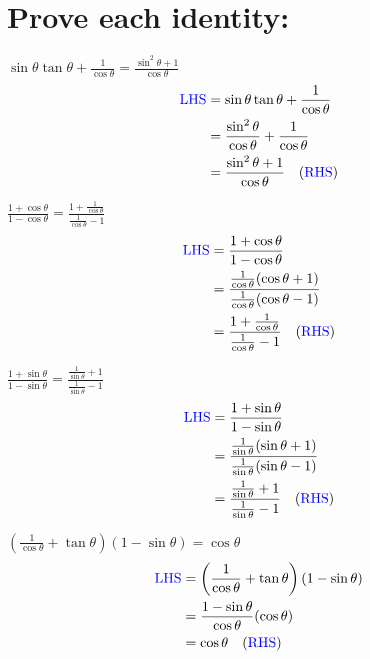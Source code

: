 \documentclass{article}
\begin{document}
\section{Prove each identity:}
\begin{multienum}
    \item $\sin \theta \tan \theta+\frac{1}{\cos \theta}=\frac{\sin ^2 \theta+1}{\cos \theta}$
    \begin{align*}
        \text{\textcolor{blue}{LHS}} &= \sin \theta \tan \theta+\frac{1}{\cos \theta} \\
        &= \frac{\sin^2 \theta}{\cos \theta}+\frac{1}{\cos \theta} \\
        &= \frac{\sin ^2 \theta+1}{\cos \theta} \quad (\text{\textcolor{blue}{RHS}})
    \end{align*}

    \item $\frac{1+\cos \theta}{1-\cos \theta}=\frac{1+\frac{1}{\cos \theta}}{\frac{1}{\cos \theta}-1}$
    \begin{align*}
        \text{\textcolor{blue}{LHS}} &= \frac{1+\cos \theta}{1-\cos \theta} \\
        &= \frac{\frac{1}{\cos \theta}(\cos \theta+1)}{\frac{1}{\cos \theta}(\cos \theta-1)} \\
        &= \frac{1+\frac{1}{\cos \theta}}{\frac{1}{\cos \theta}-1} \quad (\text{\textcolor{blue}{RHS}})
    \end{align*}

    \item $\frac{1+\sin \theta}{1-\sin \theta}=\frac{\frac{1}{\sin \theta}+1}{\frac{1}{\sin \theta}-1}$
    \begin{align*}
        \text{\textcolor{blue}{LHS}} &= \frac{1+\sin \theta}{1-\sin \theta} \\
        &= \frac{\frac{1}{\sin \theta}(\sin \theta+1)}{\frac{1}{\sin \theta}(\sin \theta-1)} \\
        &= \frac{\frac{1}{\sin \theta}+1}{\frac{1}{\sin \theta}-1} \quad (\text{\textcolor{blue}{RHS}})
    \end{align*}

    \item $\left(\frac{1}{\cos \theta}+\tan \theta\right)(1-\sin \theta)=\cos \theta$
    \begin{align*}
        \text{\textcolor{blue}{LHS}} &= \left(\frac{1}{\cos \theta}+\tan \theta\right)(1-\sin \theta) \\
        &= \frac{1-\sin \theta}{\cos \theta}(\cos \theta) \\
        &= \cos \theta \quad (\text{\textcolor{blue}{RHS}})
    \end{align*}
\end{multienum}
\end{document}
